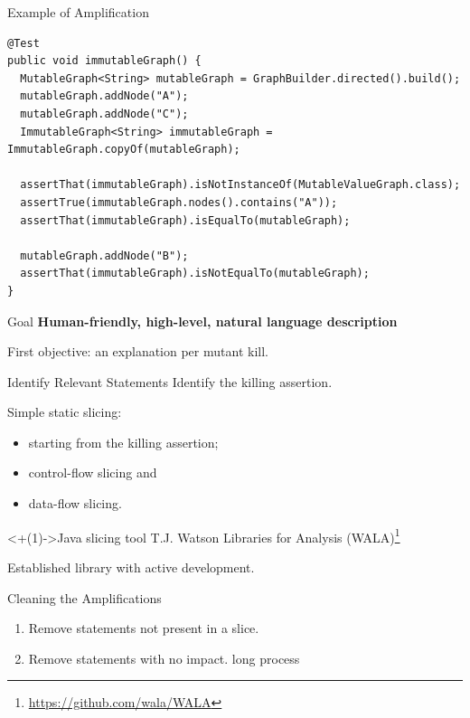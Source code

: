 \documentclass[aspectratio=169]{beamer}
\begin{document}
\begin{frame}[fragile]{Example of Amplification}
  \begin{verbatim}
@Test
public void immutableGraph() {
  MutableGraph<String> mutableGraph = GraphBuilder.directed().build();
  mutableGraph.addNode("A");
  mutableGraph.addNode("C");
  ImmutableGraph<String> immutableGraph = ImmutableGraph.copyOf(mutableGraph);

  assertThat(immutableGraph).isNotInstanceOf(MutableValueGraph.class);
  assertTrue(immutableGraph.nodes().contains("A"));
  assertThat(immutableGraph).isEqualTo(mutableGraph);

  mutableGraph.addNode("B");
  assertThat(immutableGraph).isNotEqualTo(mutableGraph);
}
  \end{verbatim}
\end{frame}

\begin{frame}{Goal}
  \large{\textbf{\textrightarrow{} Human-friendly, high-level, natural language description}}
  \pause{}

  First objective: an explanation per mutant kill.
\end{frame}

\begin{frame}{Identify Relevant Statements}
  Identify the killing assertion.
  \pause{}
  \begin{block}{Simple static slicing:}
    \begin{itemize}
      \item starting from the killing assertion;
      \item control-flow slicing and
      \item data-flow slicing.
    \end{itemize}
  \end{block}
  \vfill{}
  \begin{block}<+(1)->{Java slicing tool}
    T.J. Watson Libraries for Analysis (WALA)\footnote<+->{\url{https://github.com/wala/WALA}} %

    Established library with active development.
  \end{block}
\end{frame}

\begin{frame}{Cleaning the Amplifications}
  \begin{enumerate}[<+->]
    \item Remove statements not present in a slice.
    \item Remove statements with no impact. \textrightarrow{} long process
  \end{enumerate}
\end{frame}
\end{document}
